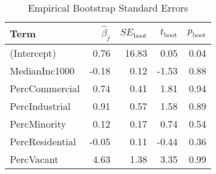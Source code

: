 \begin{table}[ht]
\centering
\begin{tabular}{lrrrr}
  \hline
Term & $\widehat{\beta}_{j}$ & $SE_{\text{boot}}$ & $t_{\text{boot}}$ & $p_{\text{boot}}$ \\ 
  \hline
(Intercept) & 0.76 & 16.83 & 0.05 & 0.04 \\ 
  MedianInc1000 & -0.18 & 0.12 & -1.53 & 0.88 \\ 
  PercCommercial & 0.74 & 0.41 & 1.81 & 0.94 \\ 
  PercIndustrial & 0.91 & 0.57 & 1.58 & 0.89 \\ 
  PercMinority & 0.12 & 0.17 & 0.74 & 0.54 \\ 
  PercResidential & -0.05 & 0.11 & -0.44 & 0.36 \\ 
  PercVacant & 4.63 & 1.38 & 3.35 & 0.99 \\ 
   \hline
\end{tabular}
\caption{Empirical Bootstrap Standard Errors} 
\end{table}
